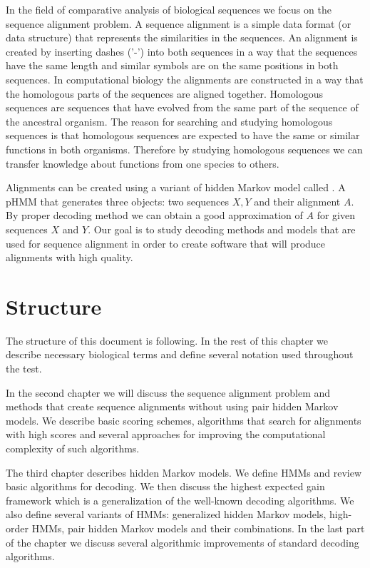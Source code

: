 In the field of comparative analysis of biological sequences we focus on the
sequence alignment problem. A sequence alignment is a simple data format (or
data structure) that represents the similarities in the sequences. An alignment
is created by inserting dashes ('-') into both sequences in a way that the
sequences have the same length and similar symbols are on the same positions in
both sequences. In computational biology the alignments are constructed in a way
that the homologous parts of the sequences are aligned together. Homologous
sequences are sequences that have evolved from the same part of the sequence of
the ancestral organism.  The reason for searching and studying homologous
sequences is that homologous sequences are expected to have the same or similar
functions in both organisms.  Therefore by studying homologous sequences we can
transfer knowledge about functions from one species to others.

Alignments can be created using a variant of hidden Markov model called
. A pHMM  that generates three
objects: two sequences $X,Y$ and their alignment $A$.  By proper decoding method
we can obtain a good approximation of $A$ for given sequences $X$ and $Y$. Our
goal is to study decoding methods and models that are used for sequence
alignment in order to create software that will produce alignments with high
quality.

\section{Structure}

The structure of this document is following. In the rest of this chapter we
describe necessary biological terms and define several notation used throughout
the test.

In the second chapter we will discuss the sequence alignment problem and methods
that create sequence alignments without using pair hidden Markov models. We
describe basic scoring schemes, algorithms that search for alignments with high
scores and several approaches for improving the computational complexity of such
algorithms.

The third chapter describes hidden Markov models. We define HMMs and review
basic algorithms for decoding. We then discuss the highest expected gain
framework which is a generalization of the well-known decoding algorithms.  We
also define several variants of HMMs: generalized hidden Markov models,
high-order HMMs, pair hidden Markov models and their combinations. In the last
part of the chapter we discuss several algorithmic improvements of standard
decoding algorithms.

